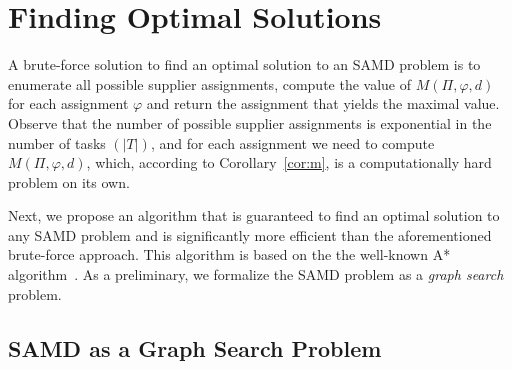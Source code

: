\documentclass[letterpaper]{article} %
\newtheorem{conjecture}{Conjecture}
\newcommand{\samd}{\ac{SAMD}\xspace}
\newcommand{\astar}{\textsc{A*}\xspace}
\begin{document}


\section{Finding Optimal Solutions}\label{sec:opt}




A brute-force solution to find an optimal solution to an \samd problem is to enumerate all possible supplier assignments, 
compute the value of $M(\Pi,\varphi, d)$ for each assignment $\varphi$ and return the assignment that yields the maximal value. Observe that the number of possible supplier assignments is exponential in the number of tasks $(|T|)$, and for each assignment we need to compute $M(\Pi, \varphi, d)$, which, according to Corollary~\ref{cor:m}, is a computationally hard problem on its own. 





Next, we propose an algorithm that is guaranteed to find an optimal solution to any \samd problem and is significantly more efficient than the aforementioned brute-force approach. This algorithm is based on the the well-known \astar algorithm~\cite{hart1968formal}. As a preliminary, we formalize the \samd problem as a \emph{graph search} problem. 


\subsection{\samd as a Graph Search Problem}
\label{sec:graph}
\end{document}
